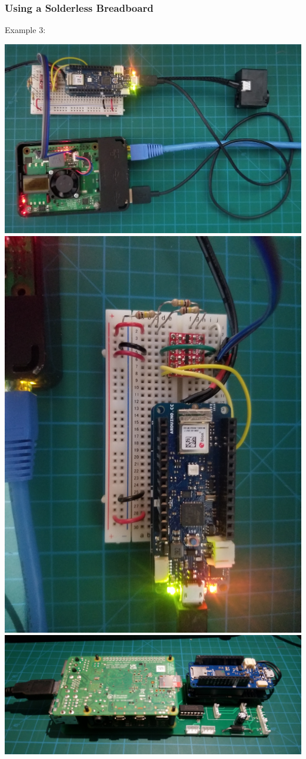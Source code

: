 \documentclass[fleqn]{beamer} %
\newcommand{\sectionIIsubsectionIItitle}{Using a Solderless Breadboard}
\begin{document}
			\begin{frame}
				\frametitle{\sectionIIsubsectionIItitle}

				Example 3:

	  			\includegraphics[scale=.04]{images/breadboard_arduino_rpi_cropped.jpg} \includegraphics[scale=.0275]{images/breadboard_arduino_serial.jpg}
	  			\includegraphics[scale=0.05]{images/sbc_mcu_carrier_v1.jpg}


\end{frame}
\end{document}
